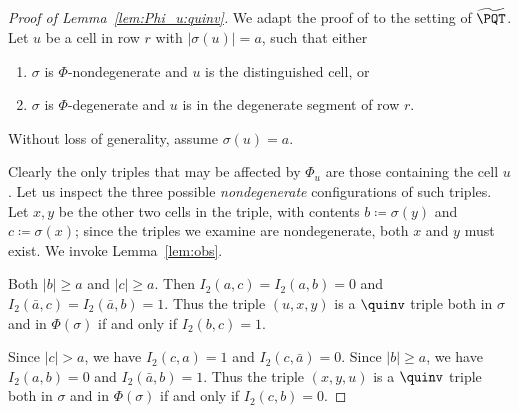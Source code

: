 \begin{proof}[Proof of Lemma~\ref{lem:Phi_u:quinv}]
We adapt the proof of \cite[Lemma 5.2]{HHL05} to the setting of $\widetilde{\PQT}$.  Let $u$ be a cell in row $r$ with $|\sigma(u)|=a$, such that either
\begin{enumerate}
\item $\sigma$ is $\Phi$-nondegenerate and $u$ is the distinguished cell, or
\item $\sigma$ is $\Phi$-degenerate and $u$ is in the degenerate segment of row $r$. 
\end{enumerate}
Without loss of generality, assume $\sigma(u)=a$. 

Clearly the only triples that may be affected by $\Phi_u$ are those containing the cell $u$. Let us inspect the three possible \emph{nondegenerate} configurations of such triples. Let $x,y$ be the other two cells in the triple, with contents $b\coloneqq\sigma(y)$ and $c\coloneqq\sigma(x)$; since the triples we examine are nondegenerate, both $x$ and $y$ must exist. We invoke Lemma~\ref{lem:obs}.
\begin{flushleft}
\end{flushleft}
Both $|b|\geq a$ and $|c|\geq a$. Then $I_2(a,c)=I_2(a,b)=0$ and $I_2(\bar{a},c)=I_2(\bar{a},b)=1$. Thus the triple $(u,x,y)$ is a $\quinv$ triple both in $\sigma$ and in $\Phi(\sigma)$ if and only if $I_2(b,c)=1$.
\begin{flushleft}
\end{flushleft}
Since $|c|>a$, we have $I_2(c,a)=1$ and $I_2(c,\bar{a})=0$. Since $|b|\geq a$, we have $I_2(a,b)=0$ and $I_2(\bar{a},b)=1$. Thus the triple $(x,y,u)$ is a $\quinv$ triple both in $\sigma$ and in $\Phi(\sigma)$ if and only if $I_2(c,b)=0$.

\end{proof}
